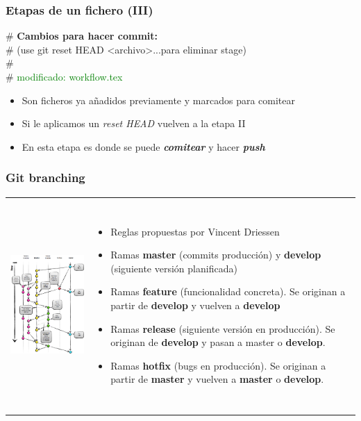 \frame
{
\frametitle{Etapas de un fichero (III)}
\begin{framed}
\# \textbf{Cambios para hacer commit:}\\
\#   (use git reset HEAD <archivo>...para eliminar stage)\\
\#\\
\#	\textcolor{green}{modificado:   workflow.tex}\\
\end{framed}

\begin{itemize}
 \item Son ficheros ya añadidos previamente y marcados para comitear
 \item Si le aplicamos un \textit{reset HEAD} vuelven a la etapa II
 \item En esta etapa es donde se puede \textit{\textbf{comitear}} y hacer \textit{\textbf{push}}
\end{itemize}
}

\frame
{
\frametitle{Git branching}

\begin{tabular}[t]{m{5cm}m{6cm}}
   \includegraphics[height=8cm]{imgs/gitbranching.png} 
   &
   \begin{itemize}
    \addtolength{\itemindent}{0.4cm}
    \item Reglas propuestas por Vincent Driessen
    \item Ramas \textbf{master} (commits producción) y \textbf{develop} (siguiente versión planificada)
    \item Ramas \textbf{feature} (funcionalidad concreta). Se originan a partir de \textbf{develop} y vuelven a \textbf{develop}
    \item Ramas \textbf{release} (siguiente versión en producción). Se originan de \textbf{develop} y pasan a master o \textbf{develop}.
    \item Ramas \textbf{hotfix} (bugs en producción). Se originan a partir de \textbf{master} y vuelven a \textbf{master} o \textbf{develop}.
   \end{itemize}
\end{tabular}
}
